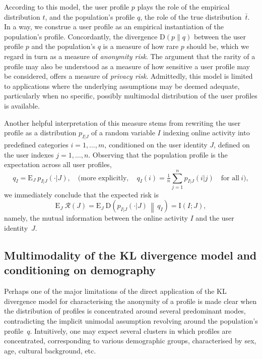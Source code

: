 According to this model, the user profile $p$ plays the role of the empirical distribution $t$, and the population's profile $q$, the role of the true distribution~$\bar{t}$. In a way, we construe a user profile as an empirical instantiation of the population's profile. Concordantly, the divergence $\mathrm{D}(p\|q)$ between the user profile $p$ and the population's $q$ is a measure of how rare $p$ should be, which we regard in turn as a measure of \emph{anonymity risk}. The argument that the rarity of a profile may also be understood as a measure of how sensitive a user profile may be considered, offers a measure of \emph{privacy risk}. Admittedly, this model is limited to applications where the underlying assumptions may be deemed adequate, particularly when no specific, possibly multimodal distribution of the user profiles is available.

Another helpful interpretation of this measure stems from rewriting the user profile as a distribution $p_{I|J}$ of a random variable $I$ indexing online activity into predefined categories $i=1,\dots,m$, conditioned on the user identity $J$, defined on the user indexes $j=1,\dots,n$. Observing that the population profile is the expectation across all user profiles,
\begin{equation*}
q_I=\mathrm{E}_J\:p_{I|J}(\cdot|J),\quad\text{(more explicitly},\quad q_I(i)=\tfrac{1}{n}\sum_{j=1}^n p_{I|J}(i|j)\quad\text{for all}\ i\text{)},
\end{equation*}
we immediately conclude that the expected risk is
\begin{equation*}
\mathrm{E}_J\:\mathcal{R}(J)=\mathrm{E}_J\:\mathrm{D}\left(p_{I|J}(\cdot|J)\,\middle\|\,q_I\right)=\mathrm{I}(I;J),
\end{equation*}
namely, the mutual information between the online activity $I$ and the user identity~$J$.

\subsection{Multimodality of the KL divergence model and conditioning on demography}
\label{sec:1-2}

\noindent
Perhaps one of the major limitations of the direct application of the KL divergence model for characterising the anonymity of a profile is made clear when the distribution of profiles is concentrated around several predominant modes, contradicting the implicit unimodal assumption revolving around the population's profile~$q$. Intuitively, one may expect several clusters in which profiles are concentrated, corresponding to various demographic groups, characterised by sex, age, cultural background, etc.


